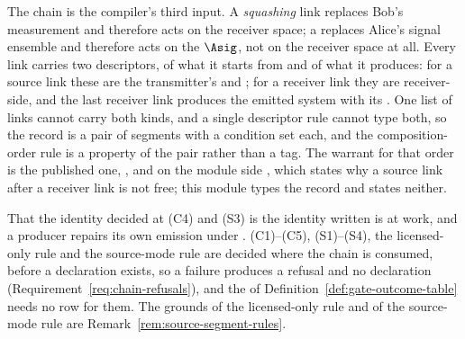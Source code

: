 
The chain is the compiler's third input. A \emph{squashing} link replaces
Bob's measurement and therefore acts on the receiver space; a
 replaces Alice's signal ensemble and therefore acts on the
 $\Asig$, not on the receiver space at all. Every
link carries two descriptors, of what it starts from and of what it
produces: for a source link these are the transmitter's
 and ; for a receiver link
they are receiver-side, and the last receiver link produces the emitted
system with its . One list of links cannot carry both kinds,
and a single descriptor rule cannot type both, so the record is a pair of
segments with a condition set each, and the composition-order rule is a
property of the pair rather than a tag. The warrant for that order is the
published one, \cite[Rem.~9.2]{tupkary2026decoy}, and on the module side
, which states why a source link after a
receiver link is not free; this module types the record and states neither.

That the identity decided at (C4) and (S3) is the identity written is
 at work, and a producer repairs its own
emission under . (C1)--(C5), (S1)--(S4),
the licensed-only rule and the source-mode rule are decided where the chain
is consumed, before a declaration exists, so a failure produces a refusal and
no declaration (Requirement~\ref{req:chain-refusals}), and the  of Definition~\ref{def:gate-outcome-table} needs no row for them. The grounds of the
licensed-only rule and of the source-mode rule are
Remark~\ref{rem:source-segment-rules}.

